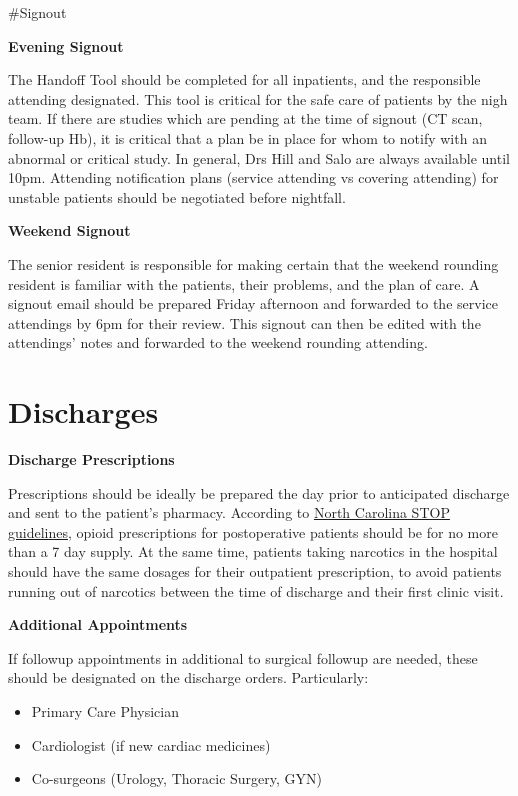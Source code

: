 \documentclass[
]{book}
\providecommand{\tightlist}{%
  \setlength{\itemsep}{0pt}\setlength{\parskip}{0pt}}
\begin{document}
\#Signout

\textbf{Evening Signout}

The Handoff Tool should be completed for all inpatients, and the responsible attending designated. This tool is critical for the safe care of patients by the nigh team. If there are studies which are pending at the time of signout (CT scan, follow-up Hb), it is critical that a plan be in place for whom to notify with an abnormal or critical study. In general, Drs Hill and Salo are always available until 10pm. Attending notification plans (service attending vs covering attending) for unstable patients should be negotiated before nightfall.

\textbf{Weekend Signout}

The senior resident is responsible for making certain that the weekend rounding resident is familiar with the patients, their problems, and the plan of care. A signout email should be prepared Friday afternoon and forwarded to the service attendings by 6pm for their review. This signout can then be edited with the attendings' notes and forwarded to the weekend rounding attending.

\hypertarget{discharges}{%
\chapter{Discharges}\label{discharges}}

\textbf{Discharge Prescriptions}

Prescriptions should be ideally be prepared the day prior to anticipated discharge and sent to the patient's pharmacy. According to \href{https://www.ncmedboard.org/images/uploads/license_applications/STOPAct-focusedFAQs-Sept2019.pdf}{North Carolina STOP guidelines}, opioid prescriptions for postoperative patients should be for no more than a 7 day supply. At the same time, patients taking narcotics in the hospital should have the same dosages for their outpatient prescription, to avoid patients running out of narcotics between the time of discharge and their first clinic visit.

\textbf{Additional Appointments}

If followup appointments in additional to surgical followup are needed, these should be designated on the discharge orders. Particularly:

\begin{itemize}
\tightlist
\item
  Primary Care Physician
\item
  Cardiologist (if new cardiac medicines)
\item
  Co-surgeons (Urology, Thoracic Surgery, GYN)
\end{itemize}
\end{document}
